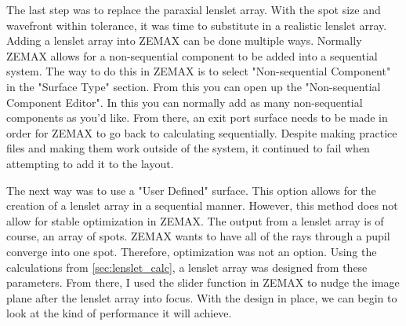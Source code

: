 The last step was to replace the paraxial lenslet array.  With the spot size and
wavefront within tolerance, it was time to substitute in a realistic lenslet array.
Adding a lenslet array into ZEMAX can be done multiple ways.  Normally ZEMAX allows
for a non-sequential component to be added into a sequential system.  The way to do this
in ZEMAX is to select "Non-sequential Component" in the "Surface Type" section.  From this
you can open up the "Non-sequential Component Editor".  In this you can normally add as
many non-sequential components as you'd like.  From there, an exit port surface needs to be
made in order for ZEMAX to go back to calculating sequentially\cite{zemax_non_seq}. 
Despite making practice files and making them work outside of the system, it continued to
fail when attempting to add it to the layout.

The next way was to use a "User Defined" surface.  This option allows for the
creation of a lenslet array in a sequential manner.  However, this method does not
allow for stable optimization in ZEMAX.  The output from a lenslet array is of
course, an array of spots.  ZEMAX wants to have all of the rays through a pupil
converge into one spot.  Therefore, optimization was not an option.  Using the
calculations from \ref{sec:lenslet_calc}, a lenslet array was designed from these
parameters.  From there, I used the slider function in ZEMAX to nudge the image
plane after the lenslet array into focus.  With the design in place, we can begin to
look at the kind of performance it will achieve.
